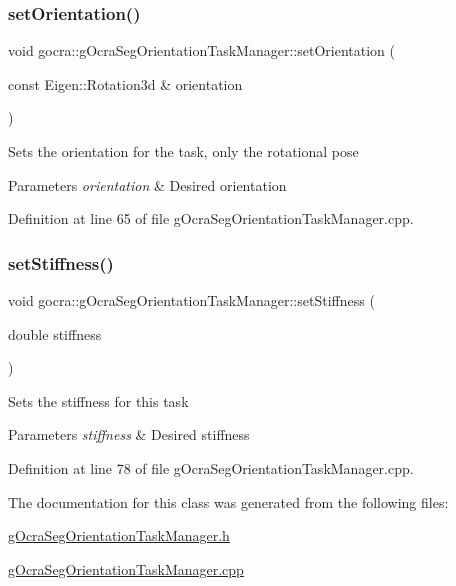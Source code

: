 \subsubsection{\texorpdfstring{set\+Orientation()}{setOrientation()}}
{\footnotesize\ttfamily void gocra\+::g\+Ocra\+Seg\+Orientation\+Task\+Manager\+::set\+Orientation (\begin{DoxyParamCaption}\item[{const Eigen\+::\+Rotation3d \&}]{orientation }\end{DoxyParamCaption})}

Sets the orientation for the task, only the rotational pose


\begin{DoxyParams}{Parameters}
{\em orientation} & Desired orientation \\
\hline
\end{DoxyParams}


Definition at line 65 of file g\+Ocra\+Seg\+Orientation\+Task\+Manager.\+cpp.

\hypertarget{classgocra_1_1gOcraSegOrientationTaskManager_abca07f3d06e8731757a9946b5255a20c}{}\label{classgocra_1_1gOcraSegOrientationTaskManager_abca07f3d06e8731757a9946b5255a20c} 
\subsubsection{\texorpdfstring{set\+Stiffness()}{setStiffness()}}
{\footnotesize\ttfamily void gocra\+::g\+Ocra\+Seg\+Orientation\+Task\+Manager\+::set\+Stiffness (\begin{DoxyParamCaption}\item[{double}]{stiffness }\end{DoxyParamCaption})}

Sets the stiffness for this task


\begin{DoxyParams}{Parameters}
{\em stiffness} & Desired stiffness \\
\hline
\end{DoxyParams}


Definition at line 78 of file g\+Ocra\+Seg\+Orientation\+Task\+Manager.\+cpp.



The documentation for this class was generated from the following files\+:\begin{DoxyCompactItemize}
\item 
\hyperlink{gOcraSegOrientationTaskManager_8h}{g\+Ocra\+Seg\+Orientation\+Task\+Manager.\+h}\item 
\hyperlink{gOcraSegOrientationTaskManager_8cpp}{g\+Ocra\+Seg\+Orientation\+Task\+Manager.\+cpp}\end{DoxyCompactItemize}
